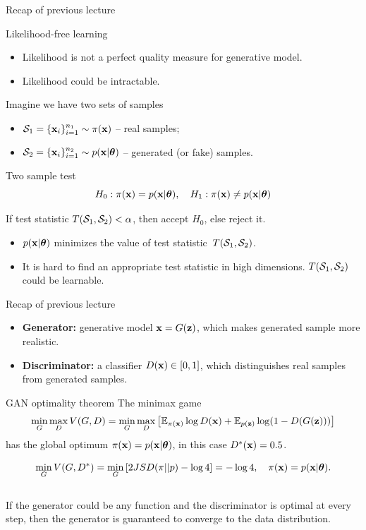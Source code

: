 \begin{frame}{Recap of previous lecture}
	\begin{block}{Likelihood-free learning}
		\begin{itemize}
			\item Likelihood is not a perfect quality measure for generative model.
			\item Likelihood could be intractable.
		\end{itemize}
	\end{block}
	Imagine we have two sets of samples 
	\begin{itemize}
		\item $\mathcal{S}_1 = \{\mathbf{x}_i\}_{i=1}^{n_1} \sim \pi(\mathbf{x})$ -- real samples;
		\item $\mathcal{S}_2 = \{\mathbf{x}_i\}_{i=1}^{n_2} \sim p(\mathbf{x} | \boldsymbol{\theta})$ -- generated (or fake) samples.
	\end{itemize}
	\begin{block}{Two sample test}
		\vspace{-0.3cm}
		\[
			H_0: \pi(\mathbf{x}) = p(\mathbf{x} | \boldsymbol{\theta}), \quad H_1: \pi(\mathbf{x}) \neq p(\mathbf{x} | \boldsymbol{\theta})
		\]
	\end{block}
	If test statistic $T(\mathcal{S}_1, \mathcal{S}_2) < \alpha$, then accept $H_0$, else reject it.
		\begin{itemize}
			\item $p(\mathbf{x} | \boldsymbol{\theta})$ minimizes the value of test statistic~$T(\mathcal{S}_1, \mathcal{S}_2)$.
			\item It is hard to find an appropriate test statistic in high dimensions. $T(\mathcal{S}_1, \mathcal{S}_2)$ could be learnable.
		\end{itemize}
\end{frame}
\begin{frame}{Recap of previous lecture}
	\begin{itemize}
		\item \textbf{Generator:} generative model $\mathbf{x} = G(\mathbf{z})$, which makes generated sample more realistic.
		\item \textbf{Discriminator:} a classifier $D(\mathbf{x}) \in [0, 1]$, which distinguishes real samples from generated samples.
	\end{itemize}
	
	\begin{block}{GAN optimality theorem}
		The minimax game 
		\vspace{-0.2cm}
		\[
			\min_{G} \max_D V(G, D) = \min_{G} \max_D \left[ \mathbb{E}_{\pi(\mathbf{x})} \log D(\mathbf{x}) + \mathbb{E}_{p(\mathbf{z})} \log (1 - D(G(\mathbf{z}))) \right]
		\]
		 has the global optimum $\pi(\mathbf{x}) = p(\mathbf{x} | \boldsymbol{\theta})$, in this case $D^*(\mathbf{x}) = 0.5$.
	\end{block}
	\vspace{-0.5cm}
	\[
		\min_{G} V(G, D^*) = \min_{G} \left[ 2 JSD(\pi || p) - \log 4 \right] = -\log 4, \quad \pi(\mathbf{x}) = p(\mathbf{x} | \boldsymbol{\theta}).
	\]
	\vspace{-0.4cm} \\
	If the generator could be any function and the discriminator is optimal at every step, then the generator is guaranteed to converge to the data distribution.
\end{frame}
